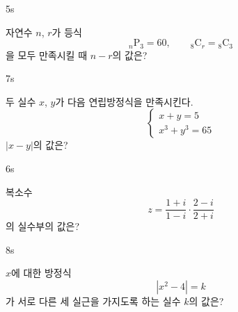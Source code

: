\documentclass[10pt]{article}
\begin{document}
\begin{pagepair}
\noindent
\begin{minipage}[t][\probboxheight][t]{0.46\linewidth}
\begin{problem}{5}{s}
\par\smallskip
자연수 $n$, $r$가 등식
\[ {}_n\mathrm{P}_3 = 60,\qquad {}_8\mathrm{C}_r = {}_8\mathrm{C}_3 \]
을 모두 만족시킬 때 $n - r$의 값은? 
\begin{choices}
\end{choices}
\end{problem}
\end{minipage}\hfill
\begin{minipage}[t][\probboxheight][t]{0.46\linewidth}
\begin{problem}{7}{s}
\par\smallskip
두 실수 $x$, $y$가 다음 연립방정식을 만족시킨다.
\[ \begin{cases} x + y = 5 \\ x^3 + y^3 = 65 \end{cases} \]
$|x - y|$의 값은?
\begin{choices}
\end{choices}
\end{problem}
\end{minipage}
\par\vspace{4mm}
\noindent
\begin{minipage}[t][\probboxheight][t]{0.46\linewidth}
\begin{problem}{6}{s}
\par\smallskip
복소수
\[ z = \dfrac{1 + i}{1 - i} \cdot \dfrac{2 - i}{2 + i} \]
의 실수부의 값은? 
\begin{choices}
\end{choices}
\end{problem}
\end{minipage}\hfill
\begin{minipage}[t][\probboxheight][t]{0.46\linewidth}
\begin{problem}{8}{s}
\par\smallskip
$x$에 대한 방정식
\[ |x^2 - 4| = k \]
가 서로 다른 세 실근을 가지도록 하는 실수 $k$의 값은?
\begin{choices}
\end{choices}
\end{problem}
\end{minipage}
\end{pagepair}
\end{document}
